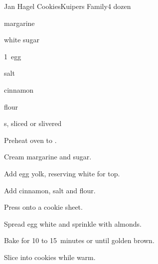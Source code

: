 \begin{recipe}{Jan Hagel Cookies}{Kuipers Family}{4 dozen}

\begin{ingredients}
\item {} margarine
\item {} white sugar
\item 1~egg
\item \tp{\half} salt
\item \tp{\half} cinnamon
\item {} flour
\item {}s, sliced or slivered
\end{ingredients}

\begin{directions}
\item Preheat oven to .
\item Cream margarine and sugar.
\item Add egg yolk, reserving white for top.
\item Add cinnamon, salt and flour.
\item Press onto a cookie sheet.
\item Spread egg white and sprinkle with almonds.
\item Bake for 10 to 15~minutes or until golden brown.
\item Slice into cookies while warm.
\end{directions}
\end{recipe}
